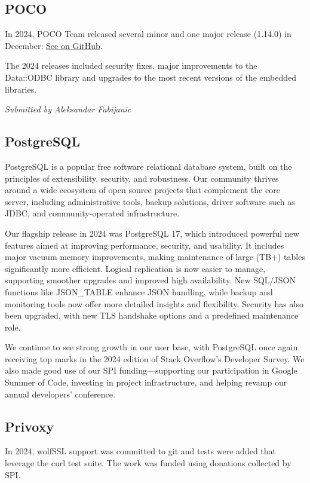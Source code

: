 \documentclass[a4paper]{report}
\begin{document}
\subsection{POCO}

In 2024, POCO Team released several minor and one major release (1.14.0) in December: \href{https://github.com/pocoproject/poco/releases/tag/poco-1.14.0-release}{See on GitHub}.

The 2024 releases included security fixes, major improvements to the Data::ODBC library and upgrades to the most recent versions of the embedded libraries.

{\em Submitted by Aleksandar Fabijanic}

\subsection{PostgreSQL}

PostgreSQL is a popular free software relational database system, built on the principles of extensibility, security, and robustness. Our community thrives around a wide ecosystem of open source projects that complement the core server, including administrative tools, backup solutions, driver software such as JDBC, and community-operated infrastructure.

Our flagship release in 2024 was PostgreSQL 17, which introduced powerful new features aimed at improving performance, security, and usability. It includes major vacuum memory improvements, making maintenance of large (TB+) tables significantly more efficient. Logical replication is now easier to manage, supporting smoother upgrades and improved high availability. New SQL/JSON functions like JSON\_TABLE enhance JSON handling, while backup and monitoring tools now offer more detailed insights and flexibility. Security has also been upgraded, with new TLS handshake options and a predefined maintenance role.

We continue to see strong growth in our user base, with PostgreSQL once again receiving top marks in the 2024 edition of Stack Overflow’s Developer Survey. We also made good use of our SPI funding—supporting our participation in Google Summer of Code, investing in project infrastructure, and helping revamp our annual developers’ conference.

\subsection{Privoxy}

In 2024, wolfSSL support was committed to git and tests were added that leverage the curl test suite. The work was funded using donations collected by SPI.
\end{document}
